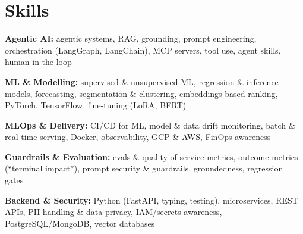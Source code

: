 \documentclass[10pt,a4paper]{article}
\begin{document}
\section{Skills}
\begin{tight}
  \item[\textcolor{accent}{\small$\bullet$}] \textbf{Agentic AI:} agentic systems, RAG, grounding, prompt engineering, orchestration (LangGraph, LangChain), MCP servers, tool use, agent skills, human-in-the-loop
  \item[\textcolor{accent}{\small$\bullet$}] \textbf{ML \& Modelling:} supervised \& unsupervised ML, regression \& inference models, forecasting, segmentation \& clustering, embeddings-based ranking, PyTorch, TensorFlow, fine-tuning (LoRA, BERT)
  \item[\textcolor{accent}{\small$\bullet$}] \textbf{MLOps \& Delivery:} CI/CD for ML, model \& data drift monitoring, batch \& real-time serving, Docker, observability, GCP \& AWS, FinOps awareness
  \item[\textcolor{accent}{\small$\bullet$}] \textbf{Guardrails \& Evaluation:} evals \& quality-of-service metrics, outcome metrics (``terminal impact''), prompt security \& guardrails, groundedness, regression gates
  \item[\textcolor{accent}{\small$\bullet$}] \textbf{Backend \& Security:} Python (FastAPI, typing, testing), microservices, REST APIs, PII handling \& data privacy, IAM/secrets awareness, PostgreSQL/MongoDB, vector databases
\end{tight}

\end{document}
